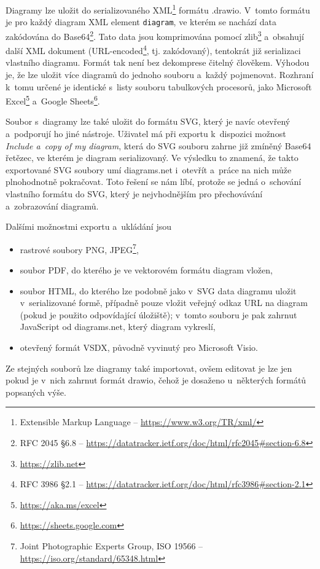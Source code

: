 Diagramy lze uložit do serializovaného XML\footnote{Extensible Markup Language
-- \url{https://www.w3.org/TR/xml/}} formátu .drawio. V~tomto formátu je pro
každý diagram XML element \texttt{diagram}, ve kterém se nachází data zakódována
do Base64\footnote{RFC 2045 \S6.8 --
\url{https://datatracker.ietf.org/doc/html/rfc2045\#section-6.8}}. Tato data
jsou komprimována pomocí zlib\footnote{\url{https://zlib.net}} a~obsahují další
XML dokument (URL-encoded\footnote{RFC 3986 \S2.1 --
\url{https://datatracker.ietf.org/doc/html/rfc3986\#section-2.1}}, tj.
zakódovaný), tentokrát již serializaci vlastního diagramu. Formát tak není bez
dekomprese čitelný člověkem. Výhodou je, že lze uložit více diagramů do jednoho
souboru a~každý pojmenovat. Rozhraní k~tomu určené je identické s~listy souboru
tabulkových procesorů, jako Microsoft Excel\footnote{\url{https://aka.ms/excel}}
a~Google Sheets\footnote{\url{https://sheets.google.com}}.

Soubor s~diagramy lze také uložit do formátu SVG, který je navíc otevřený
a~podporují ho jiné nástroje. Uživatel má při exportu k~dispozici možnost
\textit{Include a~copy of my diagram}, která do SVG souboru zahrne již zmíněný
Base64 řetězec, ve kterém je diagram serializovaný. Ve výsledku to znamená, že
takto exportované SVG soubory umí diagrams.net i~otevřít a~práce na nich může
plnohodnotně pokračovat. Toto řešení se nám líbí, protože se jedná o~schování
vlastního formátu do SVG, který je nejvhodnějším pro přechovávání a~zobrazování
diagramů.

Dalšími možnostmi exportu a~ukládání jsou
\begin{itemize}
  \item rastrové soubory PNG, JPEG\footnote{Joint Photographic Experts Group,
  ISO 19566 -- \url{https://iso.org/standard/65348.html}},
  \item soubor PDF, do kterého je ve vektorovém formátu diagram vložen,
  \item soubor HTML, do kterého lze podobně jako v~SVG data diagramu uložit
v~serializované formě, případně pouze vložit veřejný odkaz URL na diagram (pokud
je použito odpovídající úložiště); v~tomto souboru je pak zahrnut JavaScript od
diagrams.net, který diagram vykreslí,
  \item otevřený formát VSDX, původně vyvinutý pro Microsoft Visio.
\end{itemize}

Ze stejných souborů lze diagramy také importovat, ovšem editovat je lze jen
pokud je v~nich zahrnut formát drawio, čehož je dosaženo u~některých formátů
popsaných výše.

